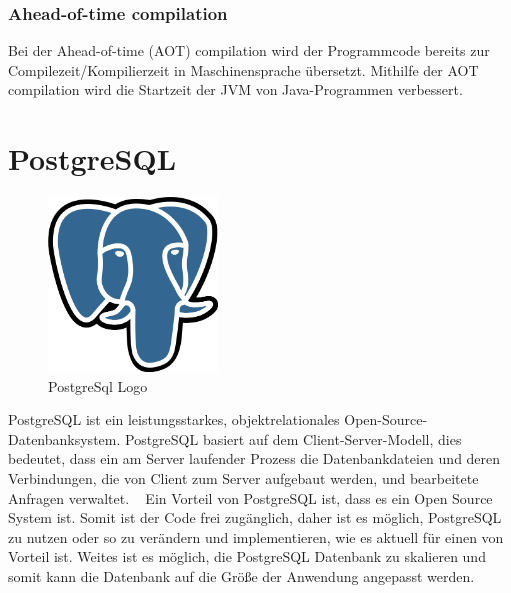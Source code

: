 \subsubsection{Ahead-of-time compilation}
Bei der Ahead-of-time (AOT) compilation wird der Programmcode bereits zur Compilezeit/Kompilierzeit in Maschinensprache
übersetzt.
\newline
Mithilfe der AOT compilation wird die Startzeit der JVM von Java-Programmen verbessert.
~\cite{ahead_of_time_compilation}

\section{PostgreSQL}
\begin{figure}
    \begin{center}
      \includegraphics[width=0.4\textwidth]{pics/postgreSql_Logo.png}
      \caption{PostgreSql Logo ~\cite{postgre_sql_logo}}
    \end{center}
\end{figure}
PostgreSQL ist ein leistungsstarkes, objektrelationales Open-Source-Datenbanksystem.
PostgreSQL basiert auf dem Client-Server-Modell, dies bedeutet,
dass ein am Server laufender Prozess die Datenbankdateien und deren Verbindungen, 
die von Client zum Server aufgebaut werden, und bearbeitete Anfragen verwaltet.
~\cite{postgre_sql}
\newline
\newline
Ein Vorteil von PostgreSQL ist, dass es ein Open Source System ist. Somit ist der Code frei zugänglich,
daher ist es möglich, PostgreSQL zu nutzen oder so zu verändern und implementieren,
wie es aktuell für einen von Vorteil ist. Weites ist es möglich, die PostgreSQL Datenbank zu skalieren und
somit kann die Datenbank auf die Größe der Anwendung angepasst werden.
~\cite{postgre_sql_cybertec}

